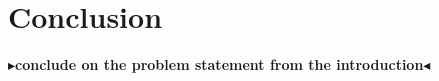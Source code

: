 \documentclass[twoside,11pt,openright]{report}
\theoremstyle{definition}                          %
\newcommand{\todo}[1]{{\color[rgb]{.5,0,0}\textbf{$\blacktriangleright$#1$\blacktriangleleft$}}}
\begin{document}

















\chapter{Conclusion}
\label{ch:conclusion}

\todo{conclude on the problem statement from the introduction}


\cleardoublepage
{}




\cleardoublepage
\appendix

\end{document}
